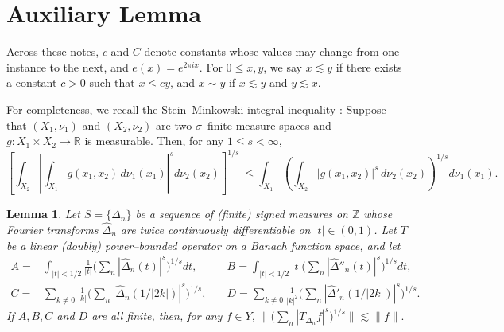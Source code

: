 \documentclass[11pt]{amsart}
\newtheorem{lemma}[thm]{Lemma}
\theoremstyle{definition}
\theoremstyle{remark}
\begin{document}



\section{Auxiliary Lemma} %
Across these notes, $c$ and $C$ denote constants whose values may change from one instance to the next, and $e(x)=e^{2\pi i x}$. For  $0\le x,y$, we say $x \lesssim y$ if there exists a constant $c>0$ such that $x \le c y$, and $x\sim y$ if $x \lesssim y$ and $y \lesssim x$.

For completeness, we recall the Stein--Minkowski integral inequality \cite{stein_M}:
Suppose that $(X_1,\nu_1)$ and $(X_2,\nu_2)$ are two $\sigma$--finite measure spaces and $g:X_1\times X_2\to \mathbb R$
is measurable. Then, for any $1\le s <\infty$,
\[\left[ \int_{X_2}
\left| \int _{X_1} g(x_1,x_2)\, d\nu_{1}(x_1) \right|^{s} d\nu_{2}(x_2)\right]^{1/s}~\leq 
\int _{X_1}\left(\int _{X_2}|g(x_1,x_2)|^{s}\,d\nu_{2}(x_2)\right)^{1/s} d\nu_1(x_1).\]



\begin{lemma}\label{lem:basic} 
Let $S=\{\Delta_n\}$ be a sequence of (finite) signed measures on $\mathbb Z$ whose Fourier transforms $\hat\Delta_n$ 
are twice continuously differentiable on $|t|\in (0,1)$. Let $T$ be a linear (doubly) power--bounded operator on a Banach function space, and
let
\begin{align*} 
A= & \int_{|t|<1/2} \frac 1{|t|} \Big( \sum_n |\hat \Delta_n(t)|^s \Big)^{1/s} dt,  \quad
& B=  \int_{|t|<1/2} |t| \Big( \sum_n |\hat \Delta''_n(t)|^s \Big)^{1/s} dt, \\
 C=& \sum_{k\neq 0} \frac 1{|k|} \Big( \sum_n |\hat \Delta_n(1/|2k|)|^s \Big)^{1/s},  \quad
 & D= \sum_{k\neq 0} \frac 1{|k|^2} \Big( \sum_n |\hat \Delta'_n(1/|2k|)|^s \Big)^{1/s}. 
\end{align*}
If $A, B, C$ and $D$ are all finite,  then, for any $f\in Y$,
$\Big\lVert  \Big( \sum_n |T_{\Delta_n}f|^s \Big)^{1/s} \Big\rVert \lesssim \lVert f\rVert.$
\end{lemma}
\end{document}
